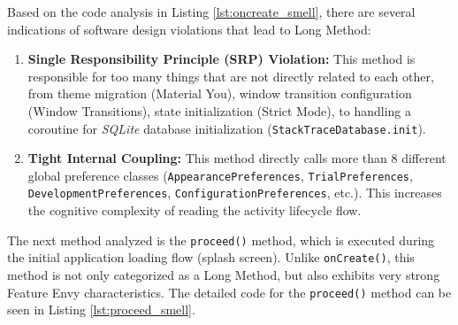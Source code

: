 \documentclass[]{einformatica}
\begin{document}
Based on the code analysis in Listing \ref{lst:oncreate_smell}, there are several indications of software design violations that lead to Long Method:
\begin{enumerate}
	\item \textbf{Single Responsibility Principle (SRP) Violation:} This method is responsible for too many things that are not directly related to each other, from theme migration (Material You), window transition configuration (Window Transitions), state initialization (Strict Mode), to handling a coroutine for \textit{SQLite} database initialization (\texttt{StackTraceDatabase.init}).
	\item \textbf{Tight Internal Coupling:} This method directly calls more than 8 different global preference classes (\texttt{AppearancePreferences}, \texttt{TrialPreferences}, \texttt{DevelopmentPreferences}, \texttt{ConfigurationPreferences}, etc.). This increases the cognitive complexity of reading the activity lifecycle flow.
\end{enumerate}

The next method analyzed is the \texttt{proceed()} method, which is executed during the initial application loading flow (splash screen). Unlike \texttt{onCreate()}, this method is not only categorized as a Long Method, but also exhibits very strong Feature Envy characteristics. The detailed code for the \texttt{proceed()} method can be seen in Listing \ref{lst:proceed_smell}.
\end{document}
